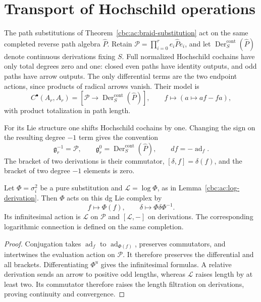 \section{Transport of Hochschild operations}

The path substitutions of Theorem~\ref{cbc:ac:braid-substitution}
act on the same completed reverse path algebra \(\widehat P\).
Retain \(\mathcal P=\prod_{i=0}^r e_i\widehat P e_i\), and let
\(\operatorname{Der}^{\mathrm{cont}}_S(\widehat P)\) denote
continuous derivations fixing \(S\).  Full normalized
Hochschild cochains have only total degrees zero and one:
closed even paths have identity outputs, and odd paths have
arrow outputs.  The only differential terms are the two
endpoint actions, since products of radical arrows vanish.
Their model is
\[
 C^\bullet(A_r,A_r)=
 [\mathcal P\longrightarrow
   \operatorname{Der}^{\mathrm{cont}}_S(\widehat P)],
 \qquad f\longmapsto(a\longmapsto af-fa),
\]
with product totalization in path length.

For its Lie structure one shifts Hochschild cochains by one.
Changing the sign on the resulting degree \(-1\) term gives
the convention
\[
 \mathfrak g_r^{-1}=\mathcal P,
 \qquad\mathfrak g_r^0=
          \operatorname{Der}^{\mathrm{cont}}_S(\widehat P),
 \qquad d f=-\operatorname{ad}_f.
\]
The bracket of two derivations is their commutator,
\([\delta,f]=\delta(f)\), and the bracket of two
degree \(-1\) elements is zero.

\begin{proposition}\label{cbc:rc:centre-transport}
Let \(\Phi=\sigma_i^2\) be a pure substitution and
\(\mathcal L=\log\Phi\), as in Lemma~\ref{cbc:ac:log-derivation}.
Then \(\Phi\) acts on this dg Lie complex by
\[
 f\longmapsto\Phi(f),\qquad
 \delta\longmapsto\Phi\delta\Phi^{-1}.
\]
Its infinitesimal action is \(\mathcal L\) on \(\mathcal P\)
and \([\mathcal L,-]\) on derivations.  The corresponding
logarithmic connection is defined on the same completion.
\end{proposition}

\begin{proof}
Conjugation takes \(\operatorname{ad}_f\) to
\(\operatorname{ad}_{\Phi(f)}\), preserves commutators, and
intertwines the evaluation action on \(\mathcal P\).
It therefore preserves the differential and all brackets.
Differentiating \(\Phi^u\) gives the infinitesimal formulas.
A relative derivation sends an arrow to positive odd lengths,
whereas \(\mathcal L\) raises length by at least two.
Its commutator therefore raises the length filtration on
derivations, proving continuity and convergence.
\end{proof}

